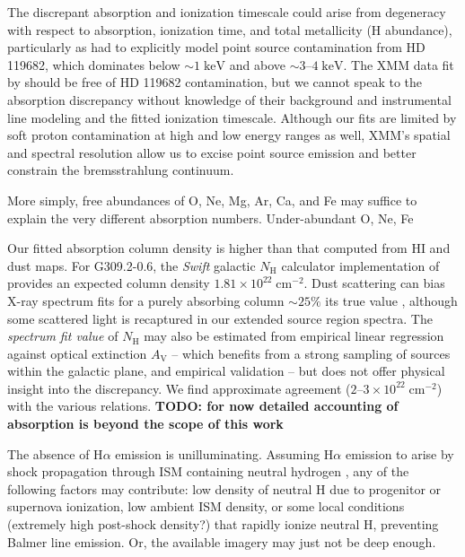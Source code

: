 \documentclass[preprint2,tighten,trackchanges]{aastex6}
\newcommand*{\mt}{\mathrm}
\newcommand*{\unit}[1]{\;\mt{#1}}  %
\newcommand*{\abt}{\mathord{\sim}} %
\newcommand*{\nH}{N_{\mathrm{H}}}
\newcommand*{\nHUnits}{\times 10^{22} \unit{cm^{-2}}}
\newcommand*{\AV}{A_{\mathrm{V}}}
\begin{document}
The discrepant absorption and ionization timescale could arise from degeneracy
with respect to absorption, ionization time, and total metallicity (H
abundance), particularly as \citet{rakowski2001} had to explicitly model point
source contamination from HD 119682, which dominates
below $\abt 1 \unit{keV}$ and above $\abt 3$--$4 \unit{keV}$.
The XMM data fit by \citet{safi-harb2007} should be free of HD 119682
contamination, but we cannot speak to the absorption discrepancy without
knowledge of their background and instrumental line modeling and the fitted
ionization timescale.
Although our fits are limited by soft proton contamination at high and
low energy ranges as well, XMM's spatial and spectral resolution allow us to
excise point source emission and better constrain the bremsstrahlung continuum.

More simply, free abundances of O, Ne, Mg, Ar, Ca, and Fe may suffice to
explain the very different absorption numbers.
Under-abundant O, Ne, Fe

Our fitted absorption column density is higher than that computed from HI and
dust maps.
For G309.2-0.6, the \textit{Swift} galactic $\nH$ calculator implementation of
\citet{willingale2013} provides an expected column density $1.81 \nHUnits$.
Dust scattering can bias X-ray spectrum fits for a purely absorbing column
$\abt25\%$ its true value \citep{corrales2016}, although
some scattered light is recaptured in our extended source region spectra.
The \textit{spectrum fit value} of $\nH$ may also be estimated from empirical
linear regression against optical extinction $\AV$ \citep[e.g.,][]{foight2016}
-- which benefits from a strong sampling of sources within the galactic plane,
and empirical validation -- but does not offer physical insight into the
discrepancy. We find approximate agreement ($2$--$3 \nHUnits$) with the various
relations.
\textbf{TODO: for now detailed accounting of absorption is beyond the scope of
this work}

The absence of H$\alpha$ emission is unilluminating.
Assuming H$\alpha$ emission to arise by shock propagation through ISM
containing neutral hydrogen \citep{chevalier1978},  %
any of the following factors may contribute: low density of neutral H due to
progenitor or supernova ionization, low ambient ISM density, or some local
conditions (extremely high post-shock density?) that rapidly ionize neutral H,
preventing Balmer line emission.
Or, the available imagery may just not be deep enough.
\end{document}
